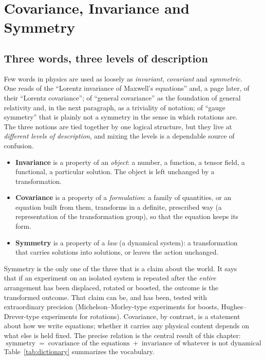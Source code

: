\documentclass[11pt,a4paper,openany]{book}
\theoremstyle{definition}
\theoremstyle{plain}
\theoremstyle{remark}
\begin{document}
\chapter{Covariance, Invariance and Symmetry}
\label{ch:cis}

\section{Three words, three levels of description}
\label{sec:three-words}

Few words in physics are used as loosely as \emph{invariant}, \emph{covariant}
and \emph{symmetric}. One reads of the ``Lorentz invariance of Maxwell's
equations'' and, a page later, of their ``Lorentz covariance''; of ``general
covariance'' as the foundation of general relativity and, in the next
paragraph, as a triviality of notation; of ``gauge symmetry'' that is plainly
not a symmetry in the sense in which rotations are. The three notions are
tied together by one logical structure, but they live at \emph{different
levels of description}, and mixing the levels is a dependable source of
confusion.

\begin{itemize}[leftmargin=1.6em,itemsep=2pt]
\item \textbf{Invariance} is a property of an \emph{object}: a number, a
  function, a tensor field, a functional, a particular solution. The object is
  left unchanged by a transformation.
\item \textbf{Covariance} is a property of a \emph{formulation}: a family of
  quantities, or an equation built from them, transforms in a definite,
  prescribed way (a representation of the transformation group), so that the
  equation keeps its form.
\item \textbf{Symmetry} is a property of a \emph{law} (a dynamical system): a
  transformation that carries solutions into solutions, or leaves the action
  unchanged.
\end{itemize}

Symmetry is the only one of the three that is a claim about the world. It
says that if an experiment on an isolated system is repeated after the
\emph{entire} arrangement has been displaced, rotated or boosted, the outcome
is the transformed outcome. That claim can be, and has been, tested with
extraordinary precision (Michelson--Morley-type experiments for boosts,
Hughes--Drever-type experiments for rotations). Covariance, by contrast, is
a statement about how we write equations; whether it carries any physical
content depends on what else is held fixed. The precise relation is the
central result of this chapter:
\begin{equation}\label{eq:slogan}
  \boxed{\;\text{symmetry}\;=\;\text{covariance of the equations}\;+\;
  \text{invariance of whatever is not dynamical}\;}
\end{equation}
Table~\ref{tab:dictionary} summarizes the vocabulary.
\end{document}
